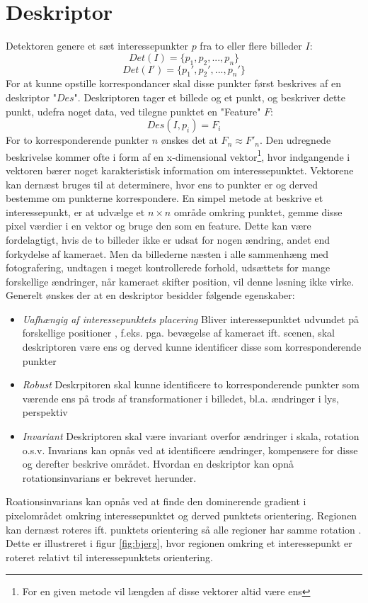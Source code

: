 \section{Deskriptor}
Detektoren genere et sæt interessepunkter $p$ fra to eller flere billeder $I$:
$$ Det(I) = \lbrace p_1,p_2,...,p_n \rbrace $$ 
$$
Det(I') = \lbrace p_1',p_2',...,p_n' \rbrace
$$
For at kunne opstille korrespondancer skal disse punkter først beskrives af en deskriptor "$Des$". Deskriptoren tager et billede og et punkt, og beskriver dette punkt, udefra noget data, ved tilegne punktet en "Feature" $F$:
$$ Des(I,p_i)=F_i $$
For to korresponderende punkter $n$ ønskes det at $F_n \approx F'_n$. Den udregnede beskrivelse kommer ofte i form af en x-dimensional vektor\footnote{For en given metode vil længden af disse vektorer altid være ens}, hvor indgangende i vektoren bærer noget karakteristisk information om interessepunktet. Vektorene kan dernæst bruges til at determinere, hvor ens to punkter er og derved bestemme om punkterne korrespondere. En simpel metode at beskrive et interessepunkt, er at udvælge et $n \times n$ område omkring punktet, gemme disse pixel værdier i en vektor og bruge den som en feature. Dette kan være fordelagtigt, hvis de to billeder ikke er udsat for nogen ændring, andet end forkydelse af kameraet. Men da billederne næsten i alle sammenhæng med fotografering, undtagen i meget kontrollerede forhold, udsættets for mange forskellige ændringer, når kameraet skifter position, vil denne løsning ikke virke. Generelt ønskes der at en deskriptor besidder følgende egenskaber:
\begin{itemize}
\item{ \textit{Uafhængig af interessepunktets placering}
Bliver interessepunktet udvundet på forskellige positioner , f.eks. pga. bevægelse af kameraet ift. scenen, skal deskriptoren være ens og derved kunne identificer disse som korresponderende punkter
 }
\item{\textit{Robust} Deskrpitoren skal kunne identificere to korresponderende punkter som værende ens på trods af transformationer i billedet, bl.a. ændringer i lys, perspektiv}
\item{\textit{Invariant} Deskriptoren skal være invariant overfor ændringer i skala, rotation o.s.v. Invarians kan opnås ved at identificere ændringer, kompensere for disse og derefter beskrive området.
Hvordan en deskriptor kan opnå rotationsinvarians er bekrevet herunder.}
\end{itemize}
Roationsinvarians kan opnås ved at finde den dominerende gradient i pixelområdet omkring interessepunktet og derved punktets orientering. Regionen kan dernæst roteres ift. punktets orientering så alle regioner har samme rotation \cite{bjerg}. Dette er illustreret i figur \ref{fig:bjerg}, hvor regionen omkring et interessepunkt er roteret relativt til interessepunktets orientering.
